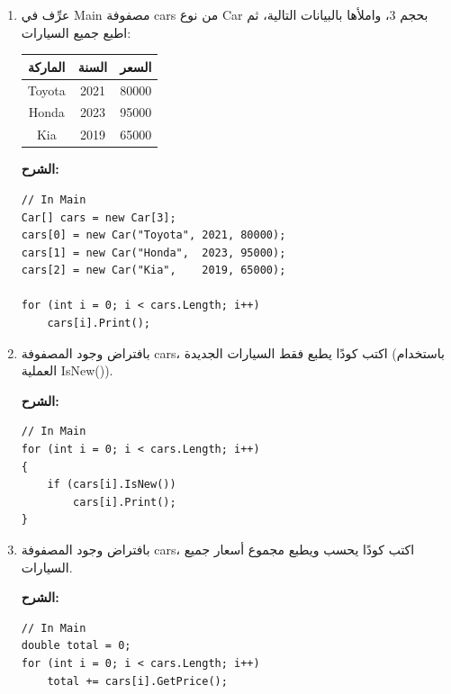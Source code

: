\documentclass[14pt]{extarticle}
\begin{document}
\begin{enumerate}

\clearpage
\item
عرِّف في \textenglish{Main} مصفوفة \textenglish{cars} من نوع \textenglish{Car} بحجم 3،
واملأها بالبيانات التالية، ثم اطبع جميع السيارات:

\begin{center}
\begin{tabular}{|c|c|c|}
\hline
\textbf{الماركة} & \textbf{السنة} & \textbf{السعر} \\
\hline
\textenglish{Toyota} & \textenglish{2021} & \textenglish{80000} \\
\textenglish{Honda}  & \textenglish{2023} & \textenglish{95000} \\
\textenglish{Kia}    & \textenglish{2019} & \textenglish{65000} \\
\hline
\end{tabular}
\end{center}

\ifwithsols
\textbf{الشرح:}
\begin{english}
{\small
\begin{verbatim}
// In Main
Car[] cars = new Car[3];
cars[0] = new Car("Toyota", 2021, 80000);
cars[1] = new Car("Honda",  2023, 95000);
cars[2] = new Car("Kia",    2019, 65000);

for (int i = 0; i < cars.Length; i++)
    cars[i].Print();
\end{verbatim}
}
\end{english}
\clearpage
\fi

\item
بافتراض وجود المصفوفة \textenglish{cars}، اكتب كودًا يطبع فقط السيارات الجديدة
(باستخدام العملية \textenglish{IsNew()}).

\ifwithsols
\textbf{الشرح:}
\begin{english}
{\small
\begin{verbatim}
// In Main
for (int i = 0; i < cars.Length; i++)
{
    if (cars[i].IsNew())
        cars[i].Print();
}
\end{verbatim}
}
\end{english}
\clearpage
\fi

\item
بافتراض وجود المصفوفة \textenglish{cars}، اكتب كودًا يحسب ويطبع مجموع أسعار
جميع السيارات.

\ifwithsols
\textbf{الشرح:}
\begin{english}
{\small
\begin{verbatim}
// In Main
double total = 0;
for (int i = 0; i < cars.Length; i++)
    total += cars[i].GetPrice();


\end{verbatim}}
\end{english}
\end{enumerate}
\end{document}
